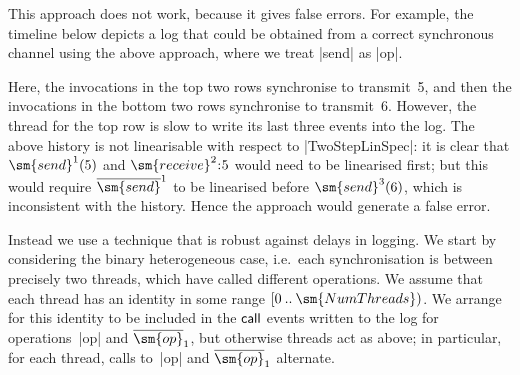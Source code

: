 This approach does not work, because it gives false errors.  For example, the
timeline below depicts a log that could be obtained from a correct synchronous
channel using the above approach, where we treat |send| as |op|.
%
\begin{center}
\unScalaMid
{}
\scalaMid
\end{center}
%
Here, the invocations in the top two rows synchronise to transmit~5, and then
the invocations in the bottom two rows synchronise to transmit~6.  However,
the thread for the top row is slow to write its last three events into the
log.  The above history is not linearisable with respect to |TwoStepLinSpec|:
it is clear that $\sm{send}^1(5)$ and $\sm{receive}^2 \:: 5$ would need to be
linearised first; but this would require $\overline{\sm{send}}^1$ to be
linearised before $\sm{send}^3(6)$, which is inconsistent with the history.
Hence the approach would generate a false error.

Instead we use a technique that is robust against delays in logging.  We start
by considering the binary heterogeneous case, i.e.~each synchronisation is
between precisely two threads, which have called different operations.  We
assume that each thread has an identity in some range $\range 0
{\sm{NumThreads}}$.  We arrange for this identity to be included in the
$\mathsf{call}$ events written to the log for operations~|op| and
$\overline{\sm{op}}_1$, but otherwise threads act as above; in particular, for
each thread, calls to~|op| and $\overline{\sm{op}}_1$ alternate.

